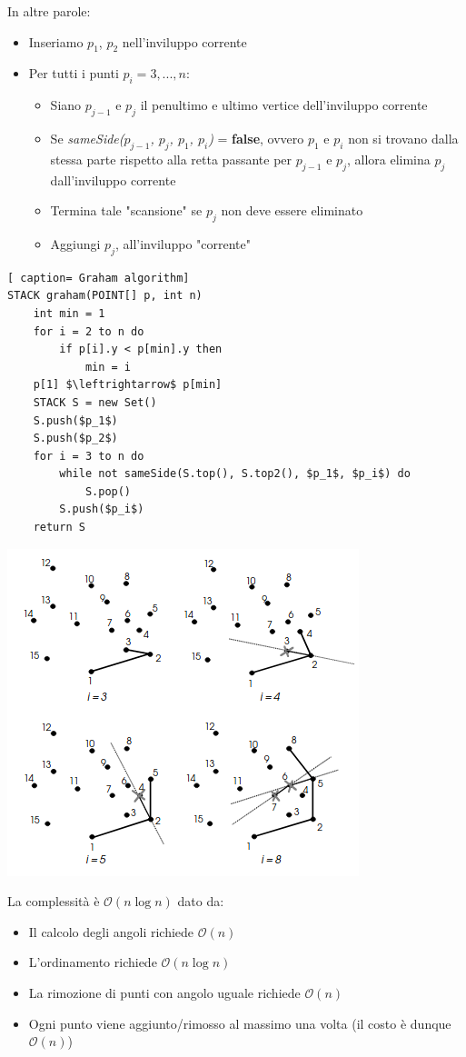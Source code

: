 \documentclass[../cheatSheetAlgoritmi.tex]{subfiles}
\begin{document}
In altre parole:
\begin{itemize}
	\item Inseriamo $p_1$, $p_2$ nell'inviluppo corrente
	\item Per tutti i punti $p_i = 3, . . . , n$:
	\begin{itemize}
		\item Siano $p_{j - 1}$ e $p_j$ il penultimo e ultimo vertice dell'inviluppo corrente
		\item Se \emph{sameSide($p_{j - 1}$, $p_j$, $p_1$, $p_i$)} = \textbf{false}, ovvero $p_1$ e $p_i$ non si trovano dalla stessa parte rispetto alla retta passante per $p_{j - 1}$ e $p_j$, allora elimina $p_j$ dall'inviluppo corrente
		\item Termina tale "scansione" se $p_j$ non deve essere eliminato
		\item Aggiungi $p_j$, all'inviluppo "corrente"
	\end{itemize}
\end{itemize}
 \begin{lstlisting}[ caption= Graham algorithm]
STACK graham(POINT[] p, int n)
	int min = 1
	for i = 2 to n do
		if p[i].y < p[min].y then 
			min = i
	p[1] $\leftrightarrow$ p[min]
	STACK S = new Set()
	S.push($p_1$)
	S.push($p_2$)
	for i = 3 to n do
		while not sameSide(S.top(), S.top2(), $p_1$, $p_i$) do
			S.pop()
		S.push($p_i$)
	return S
\end{lstlisting}
\begin{center}
	\includegraphics{../img/backtracking_inviluppo_convesso_graham_2}
\end{center}
La complessità è $\mathcal{O}(n \log n)$ dato da:
\begin{itemize}
	\item Il calcolo degli angoli richiede $\mathcal{O}(n)$
	\item L'ordinamento richiede $\mathcal{O}(n \log n)$
	\item La rimozione di punti con angolo uguale richiede $\mathcal{O}(n)$
	\item Ogni punto viene aggiunto/rimosso al massimo una volta (il costo è dunque $\mathcal{O}(n)$)
\end{itemize}
\newpage
\end{document}
